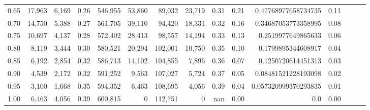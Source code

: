 \begin{tabular}{rrrrrrrrrrrrrrr}
0.65 &  17,963 &  6,169 &  0.26 &  546,955 &   53,860 &   89,032 &   23,719 &  0.31 &  0.21 &   0.47768977658734735 &      0.11 \\
0.70 &  14,750 &  5,388 &  0.27 &  561,705 &   39,110 &   94,420 &   18,331 &  0.32 &  0.16 &   0.34687053773358995 &      0.08 \\
0.75 &  10,697 &  4,137 &  0.28 &  572,402 &   28,413 &   98,557 &   14,194 &  0.33 &  0.13 &    0.2519977649865633 &      0.06 \\
0.80 &   8,119 &  3,444 &  0.30 &  580,521 &   20,294 &  102,001 &   10,750 &  0.35 &  0.10 &    0.1799895344608917 &      0.04 \\
0.85 &   6,192 &  2,854 &  0.32 &  586,713 &   14,102 &  104,855 &    7,896 &  0.36 &  0.07 &    0.1250720614451313 &      0.03 \\
0.90 &   4,539 &  2,172 &  0.32 &  591,252 &    9,563 &  107,027 &    5,724 &  0.37 &  0.05 &   0.08481521228193098 &      0.02 \\
0.95 &   3,100 &  1,668 &  0.35 &  594,352 &    6,463 &  108,695 &    4,056 &  0.39 &  0.04 &  0.057320999370293835 &      0.01 \\
1.00 &   6,463 &  4,056 &  0.39 &  600,815 &        0 &  112,751 &        0 &   nan &  0.00 &                   0.0 &      0.00 \\
\bottomrule
\end{tabular}
